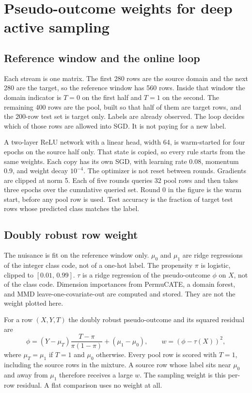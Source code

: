 \documentclass[11pt]{article}
\begin{document}
\section*{Pseudo-outcome weights for deep active sampling}

\subsection*{Reference window and the online loop}

Each stream is one matrix. The first 280 rows are the source domain and the next 280 are the target, so the reference window has 560 rows. Inside that window the domain indicator is $T=0$ on the first half and $T=1$ on the second. The remaining 400 rows are the pool, built so that half of them are target rows, and the 200-row test set is target only. Labels are already observed. The loop decides which of those rows are allowed into SGD. It is not paying for a new label.

A two-layer ReLU network with a linear head, width 64, is warm-started for four epochs on the source half only. That state is copied, so every rule starts from the same weights. Each copy has its own SGD, with learning rate 0.08, momentum 0.9, and weight decay $10^{-4}$. The optimizer is not reset between rounds. Gradients are clipped at norm 5. Each of five rounds queries 32 pool rows and then takes three epochs over the cumulative queried set. Round 0 in the figure is the warm start, before any pool row is used. Test accuracy is the fraction of target test rows whose predicted class matches the label.

\subsection*{Doubly robust row weight}

The nuisance is fit on the reference window only. $\mu_0$ and $\mu_1$ are ridge regressions of the integer class code, not of a one-hot label. The propensity $\pi$ is logistic, clipped to $[0.01,\,0.99]$. $\tau$ is a ridge regression of the pseudo-outcome $\phi$ on $X$, not of the class code. Dimension importances from PermuCATE, a domain forest, and MMD leave-one-covariate-out are computed and stored. They are not the weight plotted here.

For a row $(X,Y,T)$ the doubly robust pseudo-outcome and its squared residual are
\begin{equation}
\phi=(Y-\mu_T)\frac{T-\pi}{\pi(1-\pi)}+(\mu_1-\mu_0),
\qquad w=(\phi-\tau(X))^2,
\label{eq:po-weight}
\end{equation}
where $\mu_T=\mu_1$ if $T=1$ and $\mu_0$ otherwise. Every pool row is scored with $T=1$, including the source rows in the mixture. A source row whose label sits near $\mu_0$ and away from $\mu_1$ therefore receives a large $w$. The sampling weight is this per-row residual. A flat comparison uses no weight at all.
\end{document}
